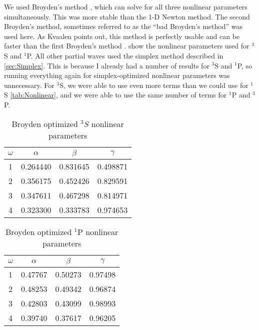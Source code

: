 \documentclass[Dissertation.tex]{subfiles}
\begin{document}
We used Broyden's method \cite{Sauer2006}, which can 
solve for all three nonlinear parameters simultaneously. This was more stable 
than the 1-D Newton method. The second Broyden's method, sometimes referred 
to as the ``bad Broyden's method'' was used here. As Kvaalen points out, this 
method is perfectly usable and can be faster than the first Broyden's method 
\cite{Kvaalen1991}. 
show the nonlinear parameters used for $^3$S and $^1$P. All other partial waves
used the simplex method described in \cref{sec:Simplex}. This is because I
already had a number of results for $^3$S and $^1$P, so running everything
again for simplex-optimized nonlinear parameters was unnecessary. For $^3$S,
we were able to use even more terms than we could use for $^1$S \cref{tab:Nonlinear},
and we were able to use the same number of terms for $^1$P and $^3$P.

\setlength{\abovecaptionskip}{6pt}   %
\setlength{\belowcaptionskip}{6pt}   %
\begin{table}
\centering
\begin{tabular}{c c c c}
\toprule
$\omega$ & $\alpha$ & $\beta$ & $\gamma$ \\ [0.5ex]
\midrule
1 & 0.264440 & 0.831645 & 0.498871 \\
2 & 0.356175 & 0.452426 & 0.829591 \\
3 & 0.347611 & 0.467298 & 0.814971 \\
4 & 0.323300 & 0.333783 & 0.974653 \\
\bottomrule
\end{tabular}
\caption{Broyden optimized $^3S$ nonlinear parameters}
\label{tab:NonlinearOptimized3SBroyden}
\end{table}


\begin{table}
\centering
\begin{tabular}{c c c c}
\toprule
$\omega$ & $\alpha$ & $\beta$ & $\gamma$ \\ [0.5ex]
\midrule
1 & 0.47767 & 0.50273 & 0.97498 \\
2 & 0.48253 & 0.49342 & 0.96874 \\
3 & 0.42803 & 0.43099 & 0.98993 \\
4 & 0.39740 & 0.37617 & 0.96205 \\
\bottomrule
\end{tabular}
\caption{Broyden optimized $^1$P nonlinear parameters}
\label{tab:BroydenPWaveSingOpt}
\end{table}
\end{document}
